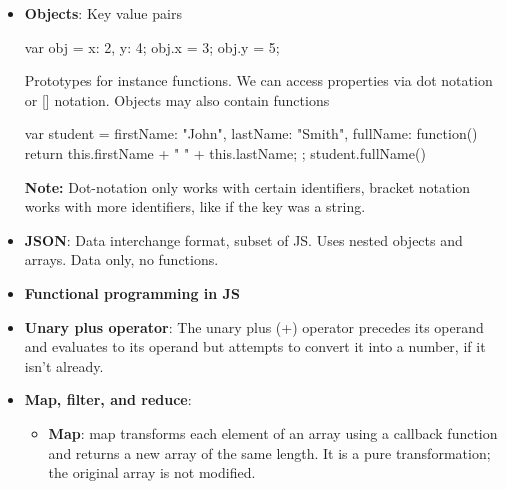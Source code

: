 \documentclass{report}
\begin{document}
\begin{itemize}
\begin{jscode}
                        console.log(data.x); // 10
                    \end{jscode}
                    \begin{itemize}
                        \item data holds a reference to the object
                        \item That reference is copied into obj
                        \item Both point to the same object
                        \item Mutating the object affects both
                    \end{itemize}
                \item \textbf{Objects}: Key value pairs
                    \bigbreak \noindent 
                    \begin{jscode}
                        var obj = {x: 2, y: 4}; obj.x = 3; obj.y = 5;
                    \end{jscode}
                    \bigbreak \noindent 
                    Prototypes for instance functions. We can access properties via dot notation or [] notation. Objects may also contain functions
                    \bigbreak \noindent 
                    \begin{jscode}
                        var student = {firstName: "John",
                            lastName: "Smith",
                            fullName: function() { return this.firstName + " " + this.lastName; }};
                        student.fullName()
                    \end{jscode}
                    \bigbreak \noindent 
                    \textbf{Note:} Dot-notation only works with certain identifiers, bracket notation works with more identifiers, like if the key was a string.
                \item \textbf{JSON}: Data interchange format, subset of JS. Uses nested objects and arrays. Data only, no functions.
                \item \textbf{Functional programming in JS}
                \item \textbf{Unary plus operator}: The unary plus (+) operator precedes its operand and evaluates to its operand but attempts to convert it into a number, if it isn't already.
                \item \textbf{Map, filter, and reduce}: 
                    \begin{itemize}
                        \item \textbf{Map}: map transforms each element of an array using a callback function and returns a new array of the same length. It is a pure transformation; the original array is not modified.

\end{itemize}
\end{itemize}
\end{document}
